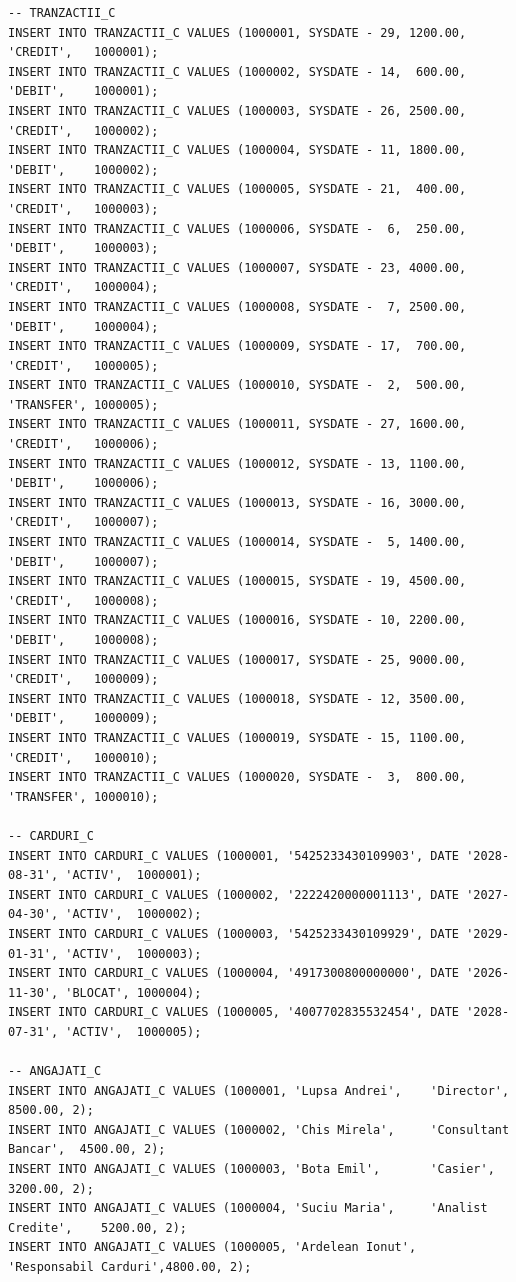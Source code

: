 \documentclass[12pt,a4paper]{article}
\begin{document}
\begin{lstlisting}
-- TRANZACTII_C
INSERT INTO TRANZACTII_C VALUES (1000001, SYSDATE - 29, 1200.00, 'CREDIT',   1000001);
INSERT INTO TRANZACTII_C VALUES (1000002, SYSDATE - 14,  600.00, 'DEBIT',    1000001);
INSERT INTO TRANZACTII_C VALUES (1000003, SYSDATE - 26, 2500.00, 'CREDIT',   1000002);
INSERT INTO TRANZACTII_C VALUES (1000004, SYSDATE - 11, 1800.00, 'DEBIT',    1000002);
INSERT INTO TRANZACTII_C VALUES (1000005, SYSDATE - 21,  400.00, 'CREDIT',   1000003);
INSERT INTO TRANZACTII_C VALUES (1000006, SYSDATE -  6,  250.00, 'DEBIT',    1000003);
INSERT INTO TRANZACTII_C VALUES (1000007, SYSDATE - 23, 4000.00, 'CREDIT',   1000004);
INSERT INTO TRANZACTII_C VALUES (1000008, SYSDATE -  7, 2500.00, 'DEBIT',    1000004);
INSERT INTO TRANZACTII_C VALUES (1000009, SYSDATE - 17,  700.00, 'CREDIT',   1000005);
INSERT INTO TRANZACTII_C VALUES (1000010, SYSDATE -  2,  500.00, 'TRANSFER', 1000005);
INSERT INTO TRANZACTII_C VALUES (1000011, SYSDATE - 27, 1600.00, 'CREDIT',   1000006);
INSERT INTO TRANZACTII_C VALUES (1000012, SYSDATE - 13, 1100.00, 'DEBIT',    1000006);
INSERT INTO TRANZACTII_C VALUES (1000013, SYSDATE - 16, 3000.00, 'CREDIT',   1000007);
INSERT INTO TRANZACTII_C VALUES (1000014, SYSDATE -  5, 1400.00, 'DEBIT',    1000007);
INSERT INTO TRANZACTII_C VALUES (1000015, SYSDATE - 19, 4500.00, 'CREDIT',   1000008);
INSERT INTO TRANZACTII_C VALUES (1000016, SYSDATE - 10, 2200.00, 'DEBIT',    1000008);
INSERT INTO TRANZACTII_C VALUES (1000017, SYSDATE - 25, 9000.00, 'CREDIT',   1000009);
INSERT INTO TRANZACTII_C VALUES (1000018, SYSDATE - 12, 3500.00, 'DEBIT',    1000009);
INSERT INTO TRANZACTII_C VALUES (1000019, SYSDATE - 15, 1100.00, 'CREDIT',   1000010);
INSERT INTO TRANZACTII_C VALUES (1000020, SYSDATE -  3,  800.00, 'TRANSFER', 1000010);

-- CARDURI_C
INSERT INTO CARDURI_C VALUES (1000001, '5425233430109903', DATE '2028-08-31', 'ACTIV',  1000001);
INSERT INTO CARDURI_C VALUES (1000002, '2222420000001113', DATE '2027-04-30', 'ACTIV',  1000002);
INSERT INTO CARDURI_C VALUES (1000003, '5425233430109929', DATE '2029-01-31', 'ACTIV',  1000003);
INSERT INTO CARDURI_C VALUES (1000004, '4917300800000000', DATE '2026-11-30', 'BLOCAT', 1000004);
INSERT INTO CARDURI_C VALUES (1000005, '4007702835532454', DATE '2028-07-31', 'ACTIV',  1000005);

-- ANGAJATI_C
INSERT INTO ANGAJATI_C VALUES (1000001, 'Lupsa Andrei',    'Director',           8500.00, 2);
INSERT INTO ANGAJATI_C VALUES (1000002, 'Chis Mirela',     'Consultant Bancar',  4500.00, 2);
INSERT INTO ANGAJATI_C VALUES (1000003, 'Bota Emil',       'Casier',             3200.00, 2);
INSERT INTO ANGAJATI_C VALUES (1000004, 'Suciu Maria',     'Analist Credite',    5200.00, 2);
INSERT INTO ANGAJATI_C VALUES (1000005, 'Ardelean Ionut',  'Responsabil Carduri',4800.00, 2);


\end{lstlisting}
\end{document}
